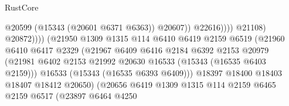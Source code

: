 \begin{lexlean}{RustCore}
\begin{coremodule}
                                                          @20599
                                                          (@15343 (@20601 @6371 @6363))
                                                          @20607))
                                                      @22616))))
                                              @21108)
                                            @20872))))
                                    (@21950
                                      @1309
                                      @1315
                                      @114
                                      @6410
                                      @6419
                                      @2159
                                      @6519
                                      (@21960
                                        @6410
                                        @6417
                                        @2329
                                        (@21967
                                          @6409
                                          @6416
                                          @2184
                                          @6392
                                          @2153
                                          @20979
                                          (@21981
                                            @6402
                                            @2153
                                            @21992
                                            @20630
                                            @16533
                                            (@15343 (@16535 @6403 @2159)))
                                          @16533
                                          (@15343 (@16535 @6393 @6409)))
                                        @18397
                                        @18400
                                        @18403
                                        @18407
                                        @18412
                                        @20650)
                                      (@20656
                                        @6419
                                        @1309
                                        @1315
                                        @114
                                        @2159
                                        @6465
                                        @2159
                                        @6517
                                        (@23897
                                          @6464
                                          @4250

\end{coremodule}
\end{lexlean}
